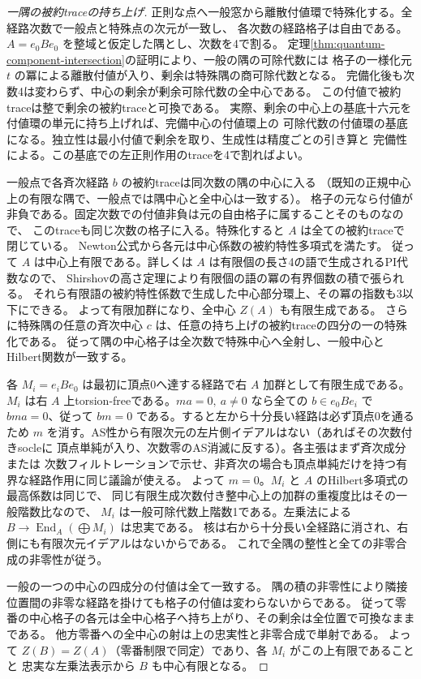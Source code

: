 \begin{proof}[一隅の被約traceの持ち上げ]
正則な点へ一般窓から離散付値環で特殊化する。全経路次数で一般点と特殊点の次元が一致し、
各次数の経路格子は自由である。$A=e_0Be_0$ を整域と仮定した隅とし、次数を4で割る。
定理\ref{thm:quantum-component-intersection}の証明により、一般の隅の可除代数には
格子の一様化元 $t$ の冪による離散付値が入り、剰余は特殊隅の商可除代数となる。
完備化後も次数4は変わらず、中心の剰余が剰余可除代数の全中心である。
この付値で被約traceは整で剰余の被約traceと可換である。
実際、剰余の中心上の基底十六元を付値環の単元に持ち上げれば、完備中心の付値環上の
可除代数の付値環の基底になる。独立性は最小付値で剰余を取り、生成性は精度ごとの引き算と
完備性による。この基底での左正則作用のtraceを4で割ればよい。

一般点で各斉次経路 $b$ の被約traceは同次数の隅の中心に入る
（既知の正規中心上の有限な隅で、一般点では隅中心と全中心は一致する）。
格子の元なら付値が非負である。固定次数での付値非負は元の自由格子に属することそのものなので、
このtraceも同じ次数の格子に入る。特殊化すると $A$ は全ての被約traceで閉じている。
Newton公式から各元は中心係数の被約特性多項式を満たす。
従って $A$ は中心上有限である。詳しくは $A$ は有限個の長さ4の語で生成されるPI代数なので、
Shirshovの高さ定理により有限個の語の冪の有界個数の積で張られる。
それら有限語の被約特性係数で生成した中心部分環上、その冪の指数も3以下にできる。
よって有限加群になり、全中心 $Z(A)$ も有限生成である。
さらに特殊隅の任意の斉次中心 $c$ は、任意の持ち上げの被約traceの四分の一の特殊化である。
従って隅の中心格子は全次数で特殊中心へ全射し、一般中心とHilbert関数が一致する。

各 $M_i=e_iBe_0$ は最初に頂点0へ達する経路で右 $A$ 加群として有限生成である。
$M_i$ は右 $A$ 上torsion-freeである。$ma=0,\ a\ne0$ なら全ての $b\in e_0Be_i$ で
$bma=0$、従って $bm=0$ である。すると左から十分長い経路は必ず頂点0を通るため
$m$ を消す。AS性から有限次元の左片側イデアルはない（あればその次数付きsocleに
頂点単純が入り、次数零のAS消滅に反する）。各主張はまず斉次成分または
次数フィルトレーションで示せ、非斉次の場合も頂点単純だけを持つ有界な経路作用に同じ議論が使える。
よって $m=0$。$M_i$ と $A$ のHilbert多項式の最高係数は同じで、
同じ有限生成次数付き整中心上の加群の重複度比はその一般階数比なので、
$M_i$ は一般可除代数上階数1である。左乗法による $B\to\operatorname{End}_A(\bigoplus M_i)$ は忠実である。
核は右から十分長い全経路に消され、右側にも有限次元イデアルはないからである。
これで全隅の整性と全ての非零合成の非零性が従う。

一般の一つの中心の四成分の付値は全て一致する。
隅の積の非零性により隣接位置間の非零な経路を掛けても格子の付値は変わらないからである。
従って零番の中心格子の各元は全中心格子へ持ち上がり、その剰余は全位置で可換なままである。
他方零番への全中心の射は上の忠実性と非零合成で単射である。
よって $Z(B)=Z(A)$（零番制限で同定）であり、各 $M_i$ がこの上有限であることと
忠実な左乗法表示から $B$ も中心有限となる。
\end{proof}

